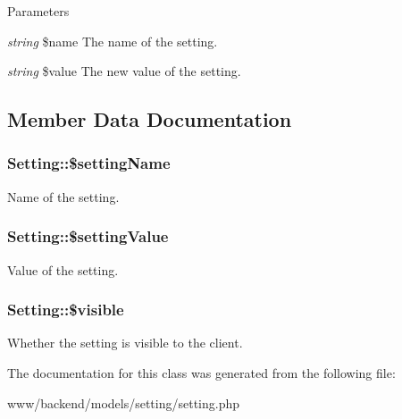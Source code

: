 \begin{DoxyParams}{Parameters}
\item[{\em string}]\$name The name of the setting. \item[{\em string}]\$value The new value of the setting. \end{DoxyParams}


\subsection{Member Data Documentation}
\hypertarget{classSetting_a59ac482046073fcae2656721ff8f8f02}{
\subsubsection[{\$settingName}]{\setlength{\rightskip}{0pt plus 5cm}Setting::\$settingName}}
\label{classSetting_a59ac482046073fcae2656721ff8f8f02}
Name of the setting. \hypertarget{classSetting_a68d581b6c71b46423725f4ea9361b1a4}{
\subsubsection[{\$settingValue}]{\setlength{\rightskip}{0pt plus 5cm}Setting::\$settingValue}}
\label{classSetting_a68d581b6c71b46423725f4ea9361b1a4}
Value of the setting. \hypertarget{classSetting_a96d719f1847bf10b5ea767fae9a6d9e0}{
\subsubsection[{\$visible}]{\setlength{\rightskip}{0pt plus 5cm}Setting::\$visible}}
\label{classSetting_a96d719f1847bf10b5ea767fae9a6d9e0}
Whether the setting is visible to the client. 

The documentation for this class was generated from the following file:\begin{DoxyCompactItemize}
\item 
www/backend/models/setting/setting.php\end{DoxyCompactItemize}
